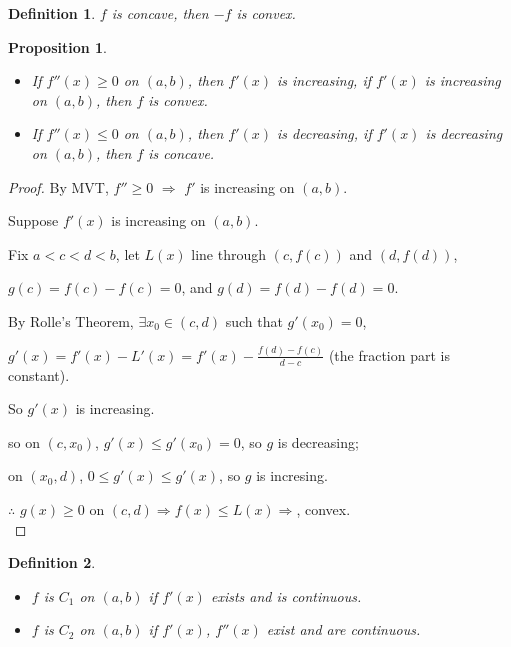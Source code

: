 \documentclass[12pt]{article}
\theoremstyle{plain}
\newtheorem{definition}{Definition}[subsection]
\newtheorem{proposition}{Proposition}[subsection]
\begin{document}
		\begin{definition}
				$f$ is concave, then $-f$ is convex.\\
			\end{definition}

		\begin{proposition}
			$ $
			\begin{itemize}
				\item If $f''(x)\geq 0$ on $(a,b)$, then $f'(x)$ is increasing, 
				if $f'(x)$ is increasing on $(a,b)$, then $f$ is convex.
				\item If $f''(x) \leq 0$ on $(a,b)$, then $f'(x)$ is decreasing,
				 if $f'(x)$ is decreasing on $(a,b)$, then $f$ is concave. 
				\end{itemize}
		\end{proposition}
		\begin{proof}
			By MVT, $f''\geq 0 \,\, \Rightarrow \,\,
			f'$ is increasing on $(a,b)$.

			Suppose $f'(x)$ is increasing on $(a,b)$.

			Fix $a<c<d<b$, let $L(x)$ line through $(c,f(c))$ and $(d,f(d))$,

			$g(c) = f(c)-f(c) = 0$, and $g(d) = f(d)-f(d) = 0$. 

			By Rolle's Theorem, $\exists x_0\in(c,d)$ such that $g'(x_0) = 0$,

			$g'(x) = f'(x) - L'(x) =f'(x)-\frac{f(d)-f(c)}{d-c}$  (the fraction part 
			is constant).

			So $g'(x)$ is increasing.

			so on $(c,x_0)$, $g'(x)\leq g'(x_0) = 0$, so $g$ is decreasing; 

			on $(x_0, d)$, $0\leq g'(x)\leq g'(x)$, so $g$ is incresing. 

			$\therefore $ $g(x) \geq 0$ on $(c,d) \Rightarrow f(x) \leq L(x) 
			\Rightarrow$, convex. \\
		\end{proof}

		\begin{definition}
			$ $
			\begin{itemize}
				\item $f$ is $C_1$ on $(a,b)$ if $f'(x)$ exists and is continuous.

				\item $f$ is $C_2$ on $(a,b)$ if $f'(x)$,
						$f''(x)$ exist and are continuous.
		\end{itemize}
		\end{definition}
\end{document}
